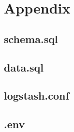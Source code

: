 \documentclass[14pt,a4paper]{extarticle}
\begin{document}
	\section*{Appendix}
	\subsection*{schema.sql}
	\label{listings:schema}
	

	\subsection*{data.sql}
	\label{listings:data}
	

	\newpage

	\subsection*{logstash.conf}
	\label{listings:pipeline}
	

	\subsection*{.env}
	\label{listings:envs}
	
\end{document}
